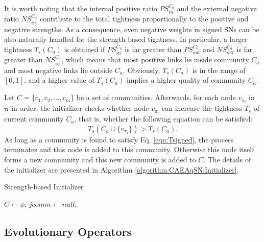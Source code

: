 \documentclass[10pt, journal]{IEEEtran}
\begin{document}
It is worth noting that the internal positive ratio $PS_{in}^{C_a}$ and the external negative ratio $NS_{in}^{C_a}$ contribute to the total tightness proportionally to the positive and negative strengths.  As a consequence, even negative weights in signed SNs can be also naturally handled for the strength-based tightness.
In particular, a larger tightness $T_{s}(C_a)$ is obtained if $PS_{in}^{C_a}$ is far greater than $PS_{out}^{C_a}$ and $NS_{out}^{C_a}$ is far greater than $NS_{in}^{C_a}$, which means that most positive links lie inside community $C_a$ and most negative links lie outside $C_a$. Obviously, $T_{s}(C_a)$ is in the range of $[0,1]$, and a higher value of $T_{s}(C_a)$ implies a higher quality of community $C_a$.

Let $C = \{c_1, c_2, ..., c_m \}$ be a set of communities. Afterwards, for each node $v_{\pi_i}$ in $\pmb{\pi}$ in order, the initializer checks whether node $v_{\pi_i}$ can increase the tightness $T_s$ of current community $C_a$, that is, whether the following equation can be satisfied:
\begin{equation} \label{eqn:Tsigned}
T_{s}(C_a \cup \{v_{\pi_i}\}) > T_{s}(C_a).
\end{equation}
As long as a community is found to satisfy Eq. \ref{eqn:Tsigned}, the process terminates and this node is added to this community. Otherwise this node itself forms a new community and this new community is added to $C$. The details of the initializer are presented in Algorithm \ref{algorithm:CAEAqSN:Initializer}.
\begin{algorithm}[!htbp]
	\caption{Strength-based Initializer} \label{algorithm:CAEAqSN:Initializer}	


    {$C \leftarrow \phi$; $jcomm \leftarrow null$};



\end{algorithm}

\subsection{Evolutionary Operators}\label{section:CAEAqSN:operators}
\end{document}
